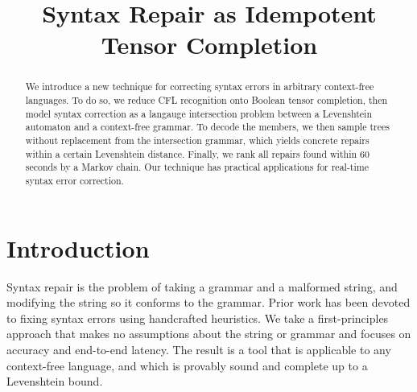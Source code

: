\documentclass[sigplan,review,anonymous,acmsmall]{acmart}\settopmatter{printfolios=false,printccs=false,printacmref=false}
\begin{document}
%
  \title{Syntax Repair as Idempotent Tensor Completion}
  \begin{abstract}

    We introduce a new technique for correcting syntax errors in arbitrary context-free languages. To do so, we reduce CFL recognition onto Boolean tensor completion, then model syntax correction as a langauge intersection problem between a Levenshtein automaton and a context-free grammar. To decode the members, we then sample trees without replacement from the intersection grammar, which yields concrete repairs within a certain Levenshtein distance. Finally, we rank all repairs found within 60 seconds by a Markov chain. Our technique has practical applications for real-time syntax error correction.

  \end{abstract}
%
%
%
%
%
  \maketitle              %


  \section{Introduction}

  Syntax repair is the problem of taking a grammar and a malformed string, and modifying the string so it conforms to the grammar. Prior work has been devoted to fixing syntax errors using handcrafted heuristics. We take a first-principles approach that makes no assumptions about the string or grammar and focuses on accuracy and end-to-end latency. The result is a tool that is applicable to any context-free language, and which is provably sound and complete up to a Levenshtein bound.
\end{document}
